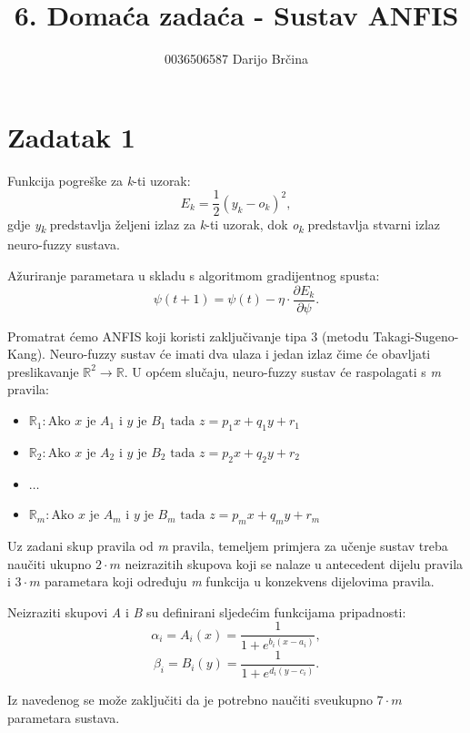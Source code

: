 \documentclass[times, utf8, seminar]{fer}
\begin{document}
\title{6. Domaća zadaća - Sustav ANFIS }
\author{0036506587 Darijo Brčina}

\maketitle

\tableofcontents

\chapter{Zadatak 1}
Funkcija pogreške za \textit{k}-ti uzorak:
\[E_k = \frac{1}{2}(y_k-o_k)^2,\]
gdje \textit{y\textsubscript{k}} predstavlja željeni izlaz za \textit{k}-ti uzorak, dok \textit{o\textsubscript{k}} predstavlja stvarni izlaz neuro-fuzzy sustava.


Ažuriranje parametara u skladu s algoritmom gradijentnog spusta:
\[\psi(t+1) = \psi(t) - \eta \cdot \frac{\partial E_k}{\partial \psi}.\]

Promatrat ćemo ANFIS koji koristi zaključivanje tipa 3 (metodu Takagi-Sugeno-Kang). Neuro-fuzzy sustav će imati dva ulaza i jedan izlaz čime će obavljati preslikavanje $\mathbb{R}^2 \rightarrow \mathbb{R}$. U općem slučaju, neuro-fuzzy sustav će raspolagati s \textit{m} pravila:
\begin{itemize}
    \item[] $\mathbb{R}_1 : \text{Ako } x \text{ je } A_1 \text{ i } y \text{ je } B_1 \text{ tada } z = p_1x + q_1y + r_1$
    \item[] $\mathbb{R}_2 : \text{Ako } x \text{ je } A_2 \text{ i } y \text{ je } B_2 \text{ tada } z = p_2x + q_2y + r_2$
    \item[] $\dots$
    \item[] $\mathbb{R}_m : \text{Ako } x \text{ je } A_m \text{ i } y \text{ je } B_m \text{ tada } z = p_mx + q_my + r_m$
\end{itemize}
Uz zadani skup pravila od \textit{m} pravila, temeljem primjera za učenje sustav treba naučiti ukupno $2 \cdot m$ neizrazitih skupova koji se nalaze u antecedent dijelu pravila i $3 \cdot m$ parametara koji određuju \textit{m} funkcija u konzekvens dijelovima pravila.

Neizraziti skupovi \textit{A} i \textit{B} su definirani sljedećim funkcijama pripadnosti:
\[\alpha_i = A_i(x) = \frac{1}{1 + e^{b_i(x-a_i)}},\]
\[\beta_i = B_i(y) = \frac{1}{1 + e^{d_i(y-c_i)}}.\]


Iz navedenog se može zaključiti da je potrebno naučiti sveukupno $7 \cdot m$ parametara sustava.
\end{document}
